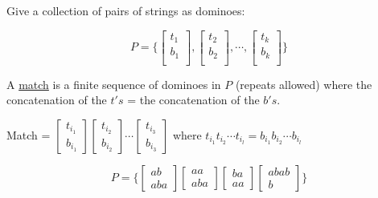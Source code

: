 \begin{problem}
    Give a collection of pairs of strings as dominoes:
    
    \[
        P = \{ 
            \begin{bmatrix}
             t_1 \\
             b_1 \\
            \end{bmatrix} 
            ,
            \begin{bmatrix}
             t_2 \\
             b_2 \\
            \end{bmatrix}
            , 
            \cdots
            ,
            \begin{bmatrix}
             t_k \\
             b_k \\
            \end{bmatrix}
        \} 
    \]

    A \underline{match} is a finite sequence of dominoes in \(P\) (repeats allowed) where the concatenation of the \(t's\) = the concatenation of the \(b's\). 

    \begin{example}
        Match = \(
        \begin{bmatrix}t_{i_1} \\b_{i_1} \end{bmatrix}
        \begin{bmatrix}t_{i_2} \\b_{i_2} \end{bmatrix}
        \cdots
        \begin{bmatrix}t_{i_3} \\b_{i_3} \end{bmatrix}
        \) 
        where \(t_{i_1}t_{i_2}\cdots t_{i_l} = b_{i_1}b_{i_2}\cdots b_{i_l}\) 
    \end{example}

    \begin{example}
        \[
            P= \{ 
            \begin{bmatrix}ab \\ aba \end{bmatrix}
            \begin{bmatrix}aa \\ aba \end{bmatrix}
            \begin{bmatrix}ba \\ aa \end{bmatrix}
            \begin{bmatrix}abab \\ b \end{bmatrix}
            \} 
        \]



\end{example}
\end{problem}
